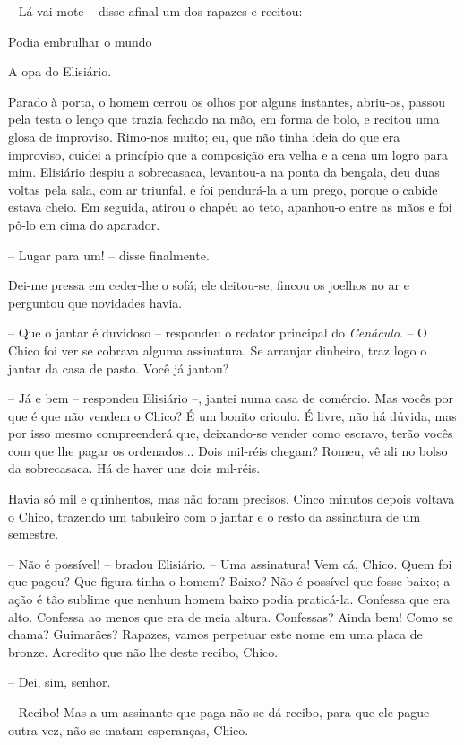 -- Lá vai mote -- disse afinal um dos rapazes e recitou:

Podia embrulhar o mundo

A opa do Elisiário.

Parado à porta, o homem cerrou os olhos por alguns instantes, abriu-os,
passou pela testa o lenço que trazia fechado na mão, em forma de bolo, e
recitou uma glosa de improviso. Rimo-nos muito; eu, que não tinha ideia
do que era improviso, cuidei a princípio que a composição era velha e a
cena um logro para mim. Elisiário despiu a sobrecasaca, levantou-a na
ponta da bengala, deu duas voltas pela sala, com ar triunfal, e foi
pendurá-la a um prego, porque o cabide estava cheio. Em seguida, atirou
o chapéu ao teto, apanhou-o entre as mãos e foi pô-lo em cima do
aparador.

-- Lugar para um! -- disse finalmente.

Dei-me pressa em ceder-lhe o sofá; ele deitou-se, fincou os joelhos no
ar e perguntou que novidades havia.

-- Que o jantar é duvidoso -- respondeu o redator principal do
\emph{Cenáculo}. -- O Chico foi ver se cobrava alguma assinatura. Se
arranjar dinheiro, traz logo o jantar da casa de pasto. Você já jantou?

-- Já e bem -- respondeu Elisiário --, jantei numa casa de comércio. Mas
vocês por que é que não vendem o Chico? É um bonito crioulo. É livre,
não há dúvida, mas por isso mesmo compreenderá que, deixando-se vender
como escravo, terão vocês com que lhe pagar os ordenados... Dois
mil-réis chegam? Romeu, vê ali no bolso da sobrecasaca. Há de haver uns
dois mil-réis.

Havia só mil e quinhentos, mas não foram precisos. Cinco minutos depois
voltava o Chico, trazendo um tabuleiro com o jantar e o resto da
assinatura de um semestre.

-- Não é possível! -- bradou Elisiário. -- Uma assinatura! Vem cá,
Chico. Quem foi que pagou? Que figura tinha o homem? Baixo? Não é
possível que fosse baixo; a ação é tão sublime que nenhum homem baixo
podia praticá-la. Confessa que era alto. Confessa ao menos que era de
meia altura. Confessas? Ainda bem! Como se chama? Guimarães? Rapazes,
vamos perpetuar este nome em uma placa de bronze. Acredito que não lhe
deste recibo, Chico.

-- Dei, sim, senhor.

-- Recibo! Mas a um assinante que paga não se dá recibo, para que ele
pague outra vez, não se matam esperanças, Chico.

